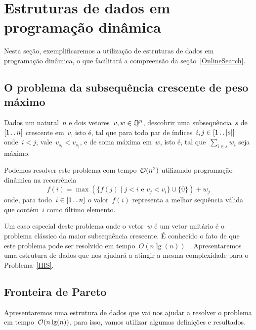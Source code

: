 \section{Estruturas de dados em programação dinâmica}
\label{EDPD}

Nesta seção, exemplificaremos a utilização de estruturas de dados em programação dinâmica, o que facilitará a compreensão da seção~\ref{OnlineSearch}.


\subsection{O problema da subsequência crescente de peso máximo}

\begin{prob} \label{HIS}
Dados um natural~$n$ e dois vetores~$v,w \in \mathbb{Q}^n$, descobrir uma subsequência~$s$ de~$[1 \,.\,.\, n]$ crescente em~$v$, isto é, tal que para todo par de índices~$i,j \in [1 \,.\,.\, |s|]$ onde~$i < j$, vale~$v_{s_i} < v_{s_j}$, e de soma máxima em~$w$, isto é, tal que~$\sum\limits_{i \in s} w_i$ seja máximo.
\end{prob}

Podemos resolver este problema com tempo~$\mathcal{O}(n^2)$ utilizando programação dinâmica na recorrência
$$f(i) = \max(\{f(j) \mid j < i \text{ e } v_j < v_i\} \cup \{0\}) + w_j$$
onde, para todo~$i \in [1 \,.\,.\, n]$ o valor~$f(i)$ representa a melhor sequência válida que contém~$i$ como último elemento.

Um caso especial deste problema onde o vetor~$w$ é um vetor unitário é o problema clássico da maior subsequência crescente. É conhecido o fato de que este problema pode ser resolvido em tempo~$O(n\lg(n))$~\cite{missing}. Apresentaremos uma estrutura de dados que nos ajudará a atingir a mesma complexidade para o Problema~\ref{HIS}.


\subsection{Fronteira de Pareto}

Apresentaremos uma estrutura de dados que vai nos ajudar a resolver o problema em tempo~$\mathcal{O}(n\lg(n))$, para isso, vamos utilizar algumas definições e resultados.

